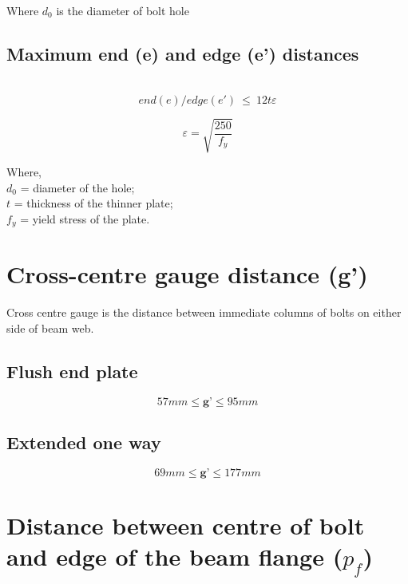 \documentclass[11.5pt,a4paper,oneside]{report}
\begin{document}
\begin{Form}
Where $d_0$ is the diameter of bolt hole

\subsection{Maximum end (e) and edge (e') distances}
\qquad \qquad [Reference: Cl. 10.2.4.3, IS 800 : 2007]\\

\begin{equation}
{end (e)/edge (e')} ~ \leq ~ 12  t  \varepsilon
\end{equation}			

	\begin{equation}
		\varepsilon = \sqrt{\frac{250}{f_y}}
	\end{equation}
	
	Where, \\
	\indent $d_0$ = diameter of the hole; \\
	\indent $t$ = thickness of the thinner plate; \\
	\indent $f_y$ = yield stress of the plate.

				
\section{Cross-centre gauge distance (g')} 
Cross centre gauge is the distance between immediate columns of bolts on either side of beam web.

		\subsection{Flush end plate}
		\qquad {}
		\begin{equation}
		 	57 mm \leq \textbf{g'} \leq 95 mm 
		\end{equation}
		
		\subsection{Extended one way}
		\qquad {}
		\begin{equation}
			 69 mm \leq \textbf{g'} \leq 177 mm
		\end{equation}

\section{Distance between centre of bolt and edge of the beam flange ($p_{f}$)}
	

\end{Form}
\end{document}
